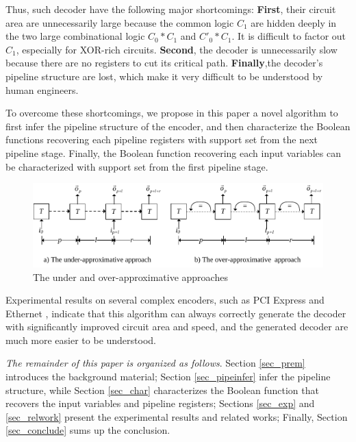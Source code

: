 \documentclass[twocolumn]{article}
\begin{document}
Thus,
such decoder have the following major shortcomings:
 \textbf{First}, their circuit area are unnecessarily large because 
 the common logic $C_1$ are hidden deeply in
 the two large combinational logic $C_0*C_1$ and $C'_0*C_1$.
 It is difficult to factor out $C_1$, 
 especially for XOR-rich circuits.
 \textbf{Second}, the decoder is unnecessarily slow because 
 there are no registers to cut its critical path.
 \textbf{Finally},the decoder's pipeline structure are lost, 
 which make it very difficult to be understood by human engineers.

To overcome these shortcomings,
we propose in this paper a novel algorithm to 
first infer the pipeline structure of the encoder,
and then characterize the Boolean functions recovering each pipeline registers with support set from the next pipeline stage.
Finally, 
the Boolean function recovering each input variables can be characterized with support set from the first pipeline stage.

\begin{figure}[t]
\begin{center}
\includegraphics[width=\textwidth]{pc}
\end{center}
\caption{The under and over-approximative approaches}
  \label{fig_pc}
\end{figure}

Experimental results on several complex encoders,
such as PCI Express \cite{pcie21} and Ethernet \cite{IEEE8023_S4},
indicate that
this algorithm can always correctly generate the decoder with significantly improved
circuit area and speed,
and the generated decoder are much more easier to be understood.

\emph{The remainder of this paper is organized as follows}.
Section \ref{sec_prem} introduces the background material;
Section \ref{sec_pipeinfer} infer the pipeline structure,
while Section \ref{sec_char} characterizes the Boolean function that recovers the input variables and pipeline registers;
Sections \ref{sec_exp} and \ref{sec_relwork} present the experimental results and related works;
Finally,
Section \ref{sec_conclude} sums up the conclusion.
\end{document}

